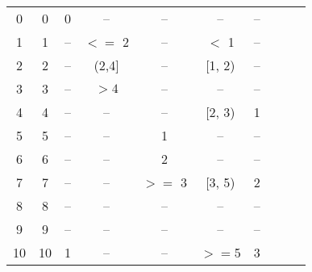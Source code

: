 \begin{table}
\begin{tabular}{|c|c|c|c|c|c|c|c|c|c|}
\hline
0                     &  0                     &  0                   &  --                        &  --                     &  --                      &    --                        &      \\   
1                     &  1                     &  --                  &  $<=$ 2                    &  --                     &  $<$ 1                   &    --                        &         \\
2                     &  2                     &  --                  &  (2,4]                     &  --                     &  [1, 2)                  &    --                        &             \\
3                     &  3                     &  --                  &  $> 4$                     &  --                     &  --                      &    --                        &          \\
4                     &  4                     &  --                  &  --                        &  --                     &  [2, 3)                  &     1                        &         \\
5                     &  5                     &  --                  &  --                        &  1                      &  --                      &    --                        &          \\
6                     &  6                     &  --                  &  --                        &  2                      &  --                      &    --                        &          \\
7                     &  7                     &  --                  &  --                        &  $>=$ 3                 &  [3, 5)                  &     2                        &            \\
8                     &  8                     &  --                  &  --                        &  --                     &  --                      &    --                        &           \\
9                     &  9                     &  --                  &  --                        &  --                     &  --                      &    --                        &           \\
10                    &  10                    &  1                   &  --                        &  --                     &   $>=$5                  &     3                        &          \\

\hline
\end{tabular}
\caption{}
\label{tab:factor_conversions}
\end{table}


